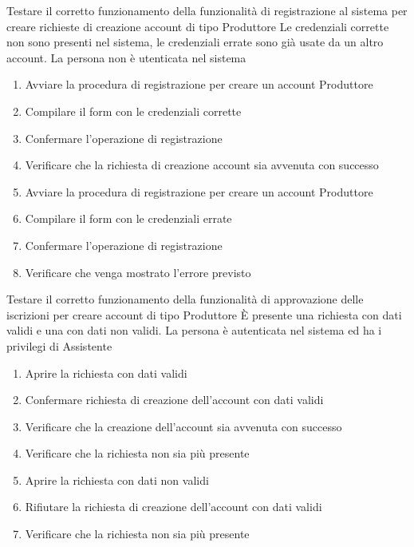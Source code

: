 
{Testare il corretto funzionamento della funzionalità di registrazione al sistema per creare richieste di creazione account di tipo Produttore}
{Le credenziali corrette non sono presenti nel sistema, le credenziali errate sono già usate da un altro account. La persona non è utenticata nel sistema}
{\begin{enumerate}
    \item Avviare la procedura di registrazione per creare un account Produttore
    \item Compilare il form con le credenziali corrette
    \item Confermare l'operazione di registrazione
    \item Verificare che la richiesta di creazione account sia avvenuta con successo
    \item Avviare la procedura di registrazione per creare un account Produttore
    \item Compilare il form con le credenziali errate
    \item Confermare l'operazione di registrazione
    \item Verificare che venga mostrato l'errore previsto
\end{enumerate}}


{Testare il corretto funzionamento della funzionalità di approvazione delle iscrizioni per creare account di tipo Produttore}
{È presente una richiesta con dati validi e una con dati non validi. La persona è autenticata nel sistema ed ha i privilegi di Assistente}
{\begin{enumerate}
    \item Aprire la richiesta con dati validi
    \item Confermare richiesta di creazione dell'account con dati validi
    \item Verificare che la creazione dell'account sia avvenuta con successo
    \item Verificare che la richiesta non sia più presente
    \item Aprire la richiesta con dati non validi
    \item Rifiutare la richiesta di creazione dell'account con dati validi
    \item Verificare che la richiesta non sia più presente
\end{enumerate}}

